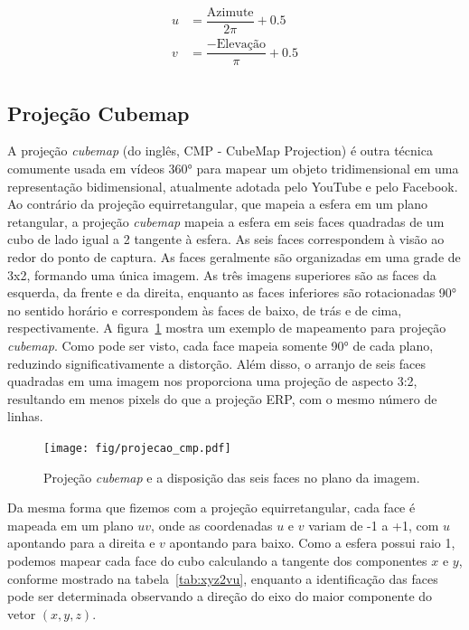\begin{equation}
	\label{eq:hcs2erp}
	\begin{split}
    u &= \dfrac{\text{Azimute}}{2\pi} + 0.5 \\
    v &= \dfrac{-\text{Elevação}}{\pi} + 0.5 \\
	\end{split}
\end{equation}

\subsection{Projeção Cubemap}

A projeção \textit{cubemap} (do inglês, CMP - CubeMap Projection) é outra técnica comumente usada em vídeos 360° para mapear um objeto tridimensional em uma representação bidimensional, atualmente adotada pelo YouTube e pelo Facebook. Ao contrário da projeção equirretangular, que mapeia a esfera em um plano retangular, a projeção \textit{cubemap} mapeia a esfera em seis faces quadradas de um cubo de lado igual a 2 tangente à esfera. As seis faces correspondem à visão ao redor do ponto de captura. As faces geralmente são organizadas em uma grade de 3x2, formando uma única imagem. As três imagens superiores são as faces da esquerda, da frente e da direita, enquanto as faces inferiores são rotacionadas 90° no sentido horário e correspondem às faces de baixo, de trás e de cima, respectivamente. A figura~\ref{fig:cmp} mostra um exemplo de mapeamento para projeção \textit{cubemap}. Como pode ser visto, cada face mapeia somente 90° de cada plano, reduzindo significativamente a distorção. Além disso, o arranjo de seis faces quadradas em uma imagem nos proporciona uma projeção de aspecto 3:2, resultando em menos pixels do que a projeção ERP, com o mesmo número de linhas.

\begin{figure}[h]
	\centering
	\texttt{[image: fig/projecao\_cmp.pdf]}
	\caption{Projeção \textit{cubemap} e a disposição das seis faces no plano da imagem.}
	\label{fig:cmp}
\end{figure}

Da mesma forma que fizemos com a projeção equirretangular, cada face é mapeada em um plano $uv$, onde as coordenadas $u$ e $v$ variam de -1 a +1, com $u$ apontando para a direita e $v$ apontando para baixo. Como a esfera possui raio 1, podemos mapear cada face do cubo calculando a tangente dos componentes $x$ e $y$, conforme mostrado na tabela~\ref{tab:xyz2vu}, enquanto a identificação das faces pode ser determinada observando a direção do eixo do maior componente do vetor $(x, y, z)$.

